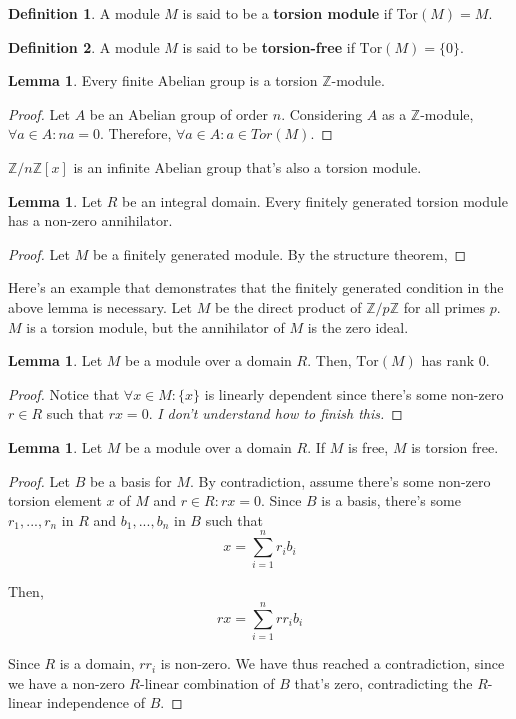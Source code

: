 \documentclass{article}
\theoremstyle{definition}
\newtheorem{definition}{Definition}
\newtheorem{lemma}[theorem]{Lemma}
\newcommand{\Z}{\mathbb{Z}}
\newcommand{\Tor}{\text{Tor}}
\begin{document}
\begin{definition}
    A module $M$ is said to be a \textbf{torsion module} if Tor$(M) = M$.
\end{definition}

\begin{definition}
    A module $M$ is said to be \textbf{torsion-free} if $\Tor(M) = \{0\}$.
\end{definition}

\begin{lemma}
    Every finite Abelian group is a torsion $\mathbb{Z}$-module.
\end{lemma}
\begin{proof}
    Let $A$ be an Abelian group of order $n$. Considering $A$ as a $\mathbb{Z}$-module, $\forall a \in A: na = 0$. Therefore, $\forall a \in A: a \in Tor(M)$. 
\end{proof}

$\mathbb{Z}/n\mathbb{Z}[x]$ is an infinite Abelian group that's also a torsion module.


\begin{lemma}
    Let $R$ be an integral domain. Every finitely generated torsion module has a non-zero annihilator.
\end{lemma}
\begin{proof}
    Let $M$ be a finitely generated module. By the structure theorem,
\end{proof}

Here's an example that demonstrates that the finitely generated condition in the above lemma
is necessary. Let $M$ be the direct product of $\Z/p\Z$ for all primes $p$. $M$ is a torsion module,
but the annihilator of $M$ is the zero ideal.

\begin{lemma}
    Let $M$ be a module over a domain $R$. Then, $\Tor(M)$ has rank $0$.
\end{lemma}
\begin{proof}
    Notice that $\forall x \in M :\{ x \}$ is linearly dependent since there's some non-zero
    $r \in R$ such that $rx = 0$. \textit{I don't understand how to finish this.}
\end{proof}

\begin{lemma}
    Let $M$ be a module over a domain $R$. If $M$ is free, $M$ is torsion free.
\end{lemma}
\begin{proof}
    Let $B$ be a basis for $M$. By contradiction, assume there's some non-zero
    torsion element $x$ of $M$ and $r \in R: rx = 0$. Since $B$ is a basis, there's some $r_{1},...,r_{n}$ in $R$
    and $b_{1},...,b_{n}$ in $B$ such that \[ x = \sum_{i = 1}^{n} r_{i}b_{i}\]

    Then, \[ rx = \sum_{i = 1}^{n} rr_{i}b_{i}\]

    Since $R$ is a domain, $r r_{i}$ is non-zero. We have thus reached a contradiction, since we
    have a non-zero $R$-linear combination of $B$ that's zero, contradicting the $R$-linear
    independence of $B$.
\end{proof}
\end{document}
